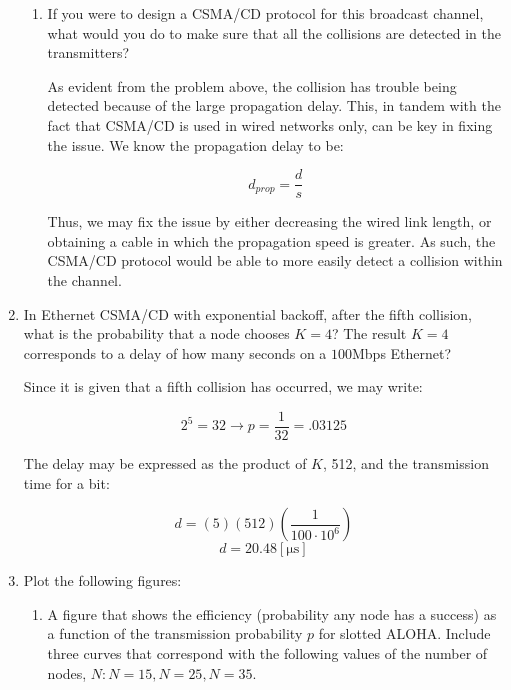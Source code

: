 \begin{enumerate}
\begin{enumerate}
        \item If you were to design a CSMA/CD protocol for this broadcast channel, what would you do to make sure that all the collisions are detected in the transmitters?

          As evident from the problem above, the collision has trouble being detected because of the large propagation delay. This, in tandem with the fact that CSMA/CD is used in wired networks only, can be key in fixing the issue. We know the propagation delay to be:

          $$d_{prop}=\frac{d}{s}$$

          Thus, we may fix the issue by either decreasing the wired link length, or obtaining a cable in which the propagation speed is greater. As such, the CSMA/CD protocol would be able to more easily detect a collision within the channel.

       \end{enumerate}

    \item In Ethernet CSMA/CD with exponential backoff, after the fifth collision, what is the probability that a node chooses $K = 4$? The result $K = 4$ corresponds to a delay of how many seconds on a $100$Mbps Ethernet?

      Since it is given that a fifth collision has occurred, we may write:

      $$\boxed{2^5=32\to p=\frac{1}{32}=.03125}$$

      The delay may be expressed as the product of $K$, 512, and the transmission time for a bit:

      $$d=(5)(512)\left( \frac{1}{100\cdot10^6} \right)$$
      $$\boxed{d=20.48[\si{\micro\second}]}$$

    \item Plot the following figures:

      \begin{enumerate}

          \item A figure that shows the efficiency (probability any node has a success) as a function of the transmission probability $p$ for slotted ALOHA. Include three curves that correspond with the following values of the number of nodes, $N: N=15,N=25, N=35$.


\end{enumerate}
\end{enumerate}
